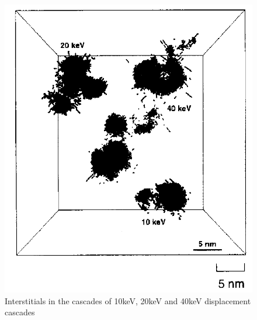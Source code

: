 \begin{figure}
  \begin{center}
    \includegraphics[width=.4\linewidth]{chapters/consequences_of_ionizing_radiation/images/stoller1996damage.png}
    \caption{Interstitials in the cascades of 10keV, 20keV and 40keV displacement cascades \cite{stollerdamage1996}}
    \label{fig:stollerdamage}
  \end{center}
\end{figure}


